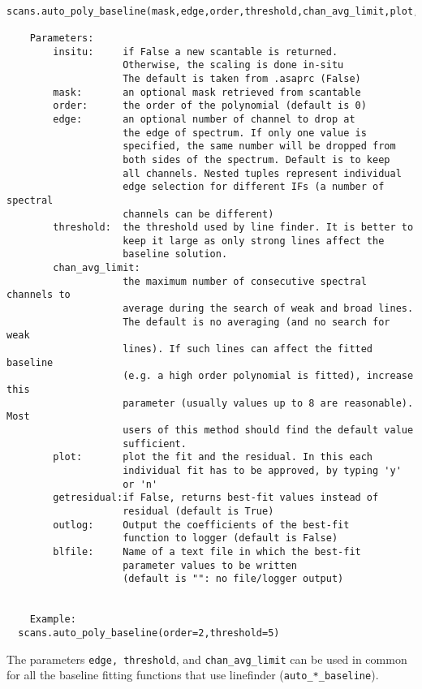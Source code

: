 \small
\begin{verbatim}
  scans.auto_poly_baseline(mask,edge,order,threshold,chan_avg_limit,plot,insitu):

    Parameters:
        insitu:     if False a new scantable is returned.
                    Otherwise, the scaling is done in-situ
                    The default is taken from .asaprc (False)
        mask:       an optional mask retrieved from scantable
        order:      the order of the polynomial (default is 0)
        edge:       an optional number of channel to drop at
                    the edge of spectrum. If only one value is
                    specified, the same number will be dropped from
                    both sides of the spectrum. Default is to keep
                    all channels. Nested tuples represent individual
                    edge selection for different IFs (a number of spectral
                    channels can be different)
        threshold:  the threshold used by line finder. It is better to
                    keep it large as only strong lines affect the
                    baseline solution.
        chan_avg_limit:
                    the maximum number of consecutive spectral channels to
                    average during the search of weak and broad lines.
                    The default is no averaging (and no search for weak
                    lines). If such lines can affect the fitted baseline
                    (e.g. a high order polynomial is fitted), increase this
                    parameter (usually values up to 8 are reasonable). Most
                    users of this method should find the default value
                    sufficient.
        plot:       plot the fit and the residual. In this each
                    individual fit has to be approved, by typing 'y'
                    or 'n'
        getresidual:if False, returns best-fit values instead of 
                    residual (default is True)
        outlog:     Output the coefficients of the best-fit 
                    function to logger (default is False)
        blfile:     Name of a text file in which the best-fit 
                    parameter values to be written 
                    (default is "": no file/logger output)


    Example:
  scans.auto_poly_baseline(order=2,threshold=5)
\end{verbatim}
\normalsize

The parameters {\tt edge, threshold}, and {\tt chan\_avg\_limit} can be used 
in common for all the baseline fitting functions that use linefinder 
({\tt auto\_*\_baseline}). 

